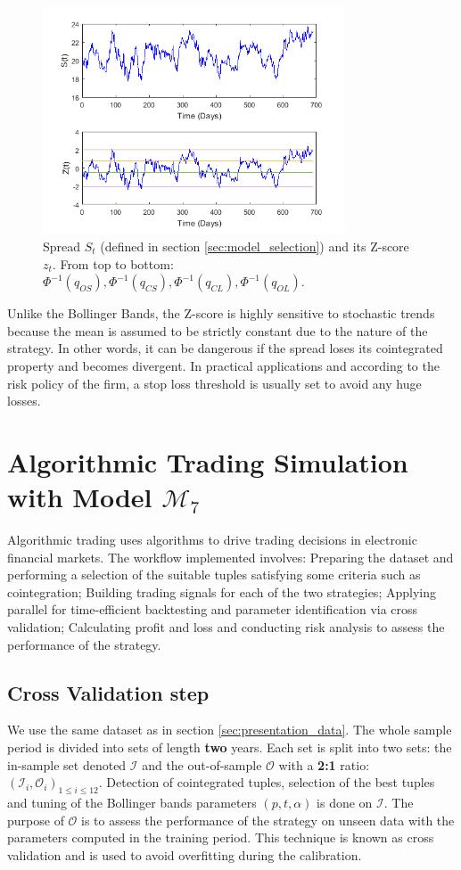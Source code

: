 \documentclass[11pt,a4,twosided,singlespacing,titlepagenumber=on]{scrreprt}
\numberwithin{equation}{chapter} %
\theoremstyle{remark}
\begin{document}
\begin{figure}[H]
\centering
\includegraphics[width = 0.8\textwidth]{zscore/zscore1}
\caption{Spread $S_t$ (defined in section \ref{sec:model_selection}) and its Z-score $z_t$. From top to bottom: $\Phi^{-1}(q_{OS}), \Phi^{-1}(q_{CS}), \Phi^{-1}(q_{CL}), \Phi^{-1}(q_{OL})$.}
\label{zscore_graphical_strat}
\end{figure}

Unlike the Bollinger Bands, the Z-score is highly sensitive to stochastic trends because the mean is assumed to be strictly constant due to the nature of the strategy. In other words, it can be dangerous if the spread loses its cointegrated property and becomes divergent. In practical applications and according to the risk policy of the firm, a stop loss threshold is usually set to avoid any huge losses.

\chapter{Algorithmic Trading Simulation with Model $\mathcal{M}_7$}
Algorithmic trading uses algorithms to drive trading decisions in electronic financial markets. The workflow implemented involves: Preparing the dataset and performing a selection of the suitable tuples satisfying some criteria such as cointegration; Building trading signals for each of the two strategies; Applying parallel for time-efficient backtesting and parameter identification via cross validation; Calculating profit and loss and conducting risk analysis to assess the performance of the strategy.

\section{Cross Validation step}
We use the same dataset as in section \ref{sec:presentation_data}. The whole sample period is divided into sets of length \textbf{two} years. Each set is split into two sets: the in-sample set denoted $\mathcal{I}$ and the out-of-sample $\mathcal{O}$ with a \textbf{2:1} ratio: $(\mathcal{I}_i, \mathcal{O}_i)_{1 \leq i \leq 12}$. Detection of cointegrated tuples, selection of the best tuples and tuning of the Bollinger bands parameters $(p,t,\alpha)$ is done on $\mathcal{I}$. The purpose of $\mathcal{O}$ is to assess the performance of the strategy on unseen data with the parameters computed in the training period. This technique is known as cross validation and is used to avoid overfitting during the calibration. 
\end{document}
